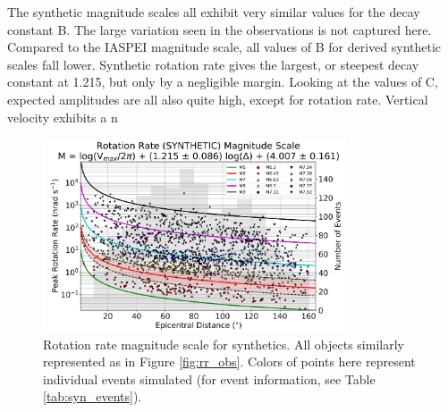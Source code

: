 \documentclass{gji}
\begin{document}
The synthetic magnitude scales all exhibit very similar values for the decay constant B. The large variation seen in the observations is not captured here. Compared to the IASPEI magnitude scale, all values of B for derived synthetic scales fall lower. Synthetic rotation rate gives the largest, or steepest decay constant at 1.215, but only by a negligible margin. Looking at the values of C, expected amplitudes are all also quite high, except for rotation rate. Vertical velocity exhibits a n

\begin{figure}
\centerline{\includegraphics[width=0.8\textwidth]{RR_SYN}}
\caption{Rotation rate magnitude scale for synthetics. All objects similarly represented as in Figure \ref{fig:rr_obs}. Colors of points here represent individual events simulated (for event information, see Table \ref{tab:syn_events}).}
\label{fig:syn_scale}
\end{figure}
\end{document}
